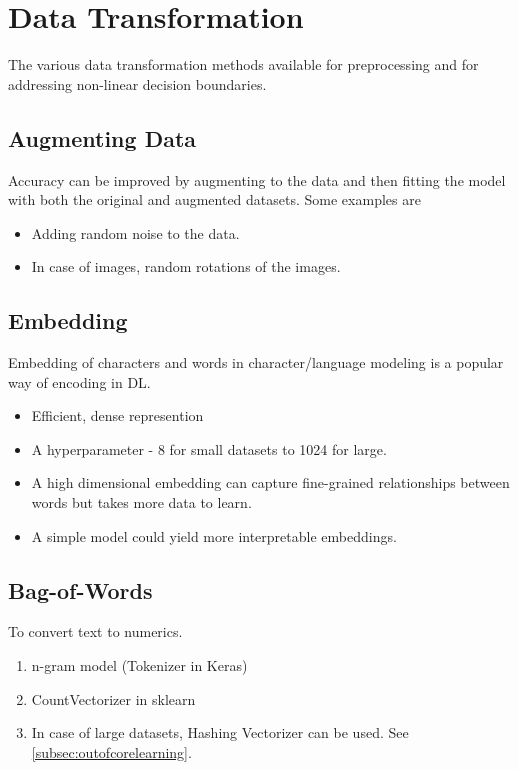 \documentclass[a4paper, 12pt]{report}
\begin{document}
\chapter{Data Transformation}
The various data transformation methods available for preprocessing and for addressing non-linear decision boundaries.


\section{Augmenting Data}
\label{sec:augmentdata}
Accuracy can be improved by augmenting to the data and then fitting the model with both the original and augmented datasets. Some examples are

\begin{itemize}
\item Adding random noise to the data.
\item In case of images, random rotations of the images.
\end{itemize}


\section{Embedding}
Embedding of characters and words in character/language modeling is a popular way of encoding in DL.
\begin{itemize}
\item Efficient, dense represention
\item A hyperparameter - 8 for small datasets to 1024 for large.
\item A high dimensional embedding can capture fine-grained relationships between words but takes more data to learn.
\item A simple model could yield more interpretable embeddings.
\end{itemize}


\section{Bag-of-Words}
To convert text to numerics.
\begin{enumerate}
\item n-gram model ({\color{cyan}Tokenizer in Keras})
\item {\color{cyan}CountVectorizer in sklearn}
\item In case of large datasets, Hashing Vectorizer can be used. See  \autoref{subsec:outofcorelearning}.
\end{enumerate}
\end{document}
